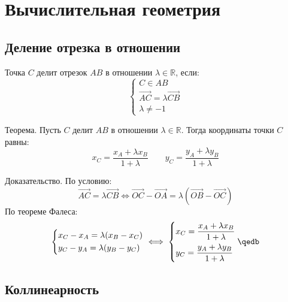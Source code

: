 \section{Вычислительная геометрия}

\subsection{Деление отрезка в отношении}

Точка $C$ делит отрезок $AB$ в отношении $\lambda\in\mathbb{R}$, если:
$$\begin{cases}
C\in AB\\
\overrightarrow{AC}=\lambda\overrightarrow{CB}\\
\lambda\neq -1
\end{cases}$$
\begin{theorem}
{\bold Теорема.} Пусть $C$ делит $AB$ в отношении $\lambda\in\mathbb{R}$. Тогда координаты точки $C$ равны:
$$x_C=\frac{x_A+\lambda x_B}{1+\lambda}\qquad y_C=\frac{y_A+\lambda y_B}{1+\lambda}$$ 
\end{theorem}

{\bold Доказательство.} По условию:
$$\overrightarrow{AC}=\lambda\overrightarrow{CB}\iff\overrightarrow{OC}-\overrightarrow{OA}=\lambda(\overrightarrow{OB}-\overrightarrow{OC})$$
По теореме Фалеса:
$$\left\{\begin{aligned}
&x_C-x_A=\lambda(x_B-x_C)\\
&y_C-y_A=\lambda(y_B-y_C)
\end{aligned}\right.\iff
\left\{\begin{aligned}
&x_C=\frac{x_A+\lambda x_B}{1+\lambda}\\
&y_C=\frac{y_A+\lambda y_B}{1+\lambda}
\end{aligned}\right.\qedb$$

\subsection{Коллинеарность}

